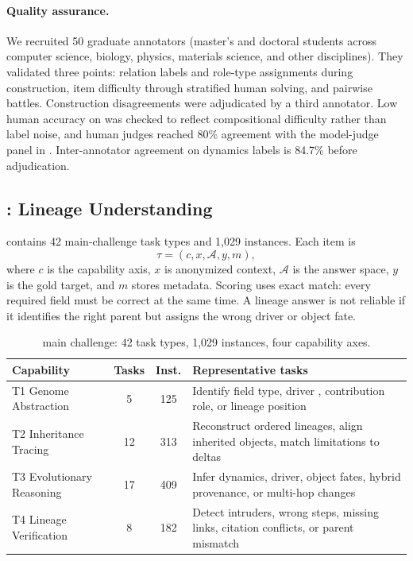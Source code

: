 \paragraph{Quality assurance.} We recruited 50 graduate annotators (master's and doctoral students across computer science, biology, physics, materials science, and other disciplines). They validated three points: \genomediff{} relation labels and role-type assignments during construction, \geneexam{} item difficulty through stratified human solving, and \genearena{} pairwise battles. Construction disagreements were adjudicated by a third annotator. Low human accuracy on \geneexam{} was checked to reflect compositional difficulty rather than label noise, and human judges reached 80\% agreement with the model-judge panel in \genearena{}. Inter-annotator agreement on dynamics labels is 84.7\% before adjudication.

\subsection{\geneexam{}: Lineage Understanding}
\label{sec:gene_exam}

\geneexam{} contains 42 main-challenge task types and 1,029 instances. Each item is
\begin{equation}
\tau=(c,x,\mathcal{A},y,m),
\label{eq:geneexam-item}
\end{equation}
where $c$ is the capability axis, $x$ is anonymized context, $\mathcal{A}$ is the answer space, $y$ is the gold target, and $m$ stores metadata. Scoring uses exact match: every required field must be correct at the same time. A lineage answer is not reliable if it identifies the right parent but assigns the wrong driver or object fate.

\begin{table}[t]
\centering
\small
\caption{\geneexam{} main challenge: 42 task types, 1,029 instances, four capability axes.}
\label{tab:benchmark}
\begin{tabular}{@{}>{\raggedright\arraybackslash}p{4.85cm}@{\;\;}c@{\;\;}c@{\;\;}>{\raggedright\arraybackslash}p{6.35cm}@{}}
\toprule
\textbf{Capability} & \textbf{Tasks} & \textbf{Inst.} & \textbf{Representative tasks} \\
\midrule
T1 Genome Abstraction & 5 & 125 & Identify field type, driver \genome{}, contribution role, or lineage position \\
T2 Inheritance Tracing & 12 & 313 & Reconstruct ordered lineages, align inherited \genome{} objects, match limitations to deltas \\
T3 Evolutionary Reasoning & 17 & 409 & Infer dynamics, driver, object fates, hybrid provenance, or multi-hop changes \\
T4 Lineage Verification & 8 & 182 & Detect intruders, wrong steps, missing links, citation conflicts, or parent mismatch \\
\bottomrule
\end{tabular}
\end{table}

